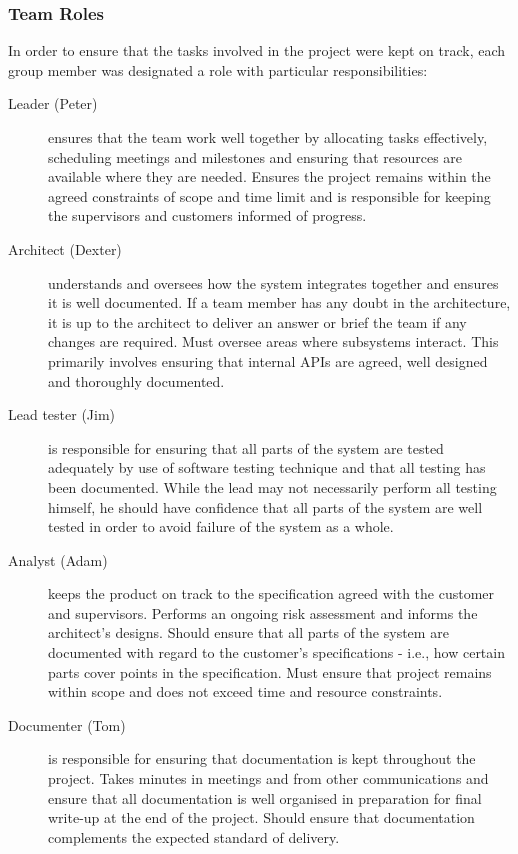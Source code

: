 \subsubsection{Team Roles}

In order to ensure that the tasks involved in the project were kept on track, each group member was designated a role with particular responsibilities:

\begin{description}
\item[Leader (Peter)] ensures that the team work well together by allocating tasks effectively, scheduling meetings and milestones and ensuring that resources are available where they are needed. Ensures the project remains within the agreed constraints of scope and time limit and is responsible for keeping the supervisors and customers informed of progress.
\item[Architect (Dexter)] understands and oversees how the system integrates together and ensures it is well documented. If a team member has any doubt in the architecture, it is up to the architect to deliver an answer or brief the team if any changes are required. Must oversee areas where subsystems interact. This primarily involves ensuring that internal APIs are agreed, well designed and thoroughly documented.
\item[Lead tester (Jim)] is responsible for ensuring that all parts of the system are tested adequately by use of software testing technique and that all testing has been documented. While the lead may not necessarily perform all testing himself, he should have confidence that all parts of the system are well tested in order to avoid failure of the system as a whole.
\item[Analyst (Adam)] keeps the product on track to the specification agreed with the customer and supervisors. Performs an ongoing risk assessment and informs the architect's designs. Should ensure that all parts of the system are documented with regard to the customer's specifications - i.e., how certain parts cover points in the specification. Must ensure that project remains within scope and does not exceed time and resource constraints.
\item[Documenter (Tom)] is responsible for ensuring that documentation is kept throughout the project. Takes minutes in meetings and from other communications and ensure that all documentation is well organised in preparation for final write-up at the end of the project. Should ensure that documentation complements the expected standard of delivery.
\end{description}

